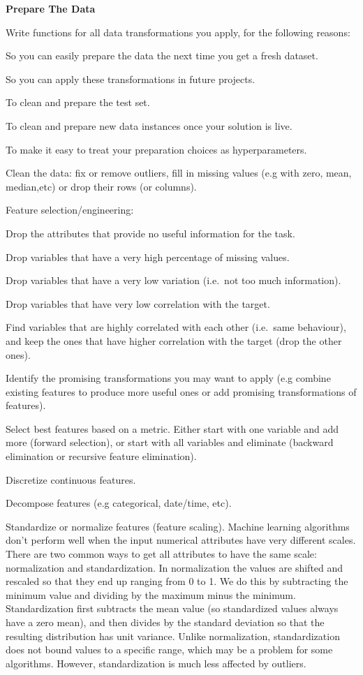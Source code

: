 \item \textbf{Prepare The Data}
\bit
\item Write functions for all data transformations you apply, for the following reasons:
\bit
\item So you can easily prepare the data the next time you get a fresh dataset.
\item So you can apply these transformations in future projects.
\item To clean and prepare the test set.
\item To clean and prepare new data instances once your solution is live.
\item To make it easy to treat your preparation choices as hyperparameters.
\eit

\item Clean the data: fix or remove outliers, fill in missing values (e.g with zero, mean, median,etc) or drop
their rows (or columns).
\item Feature selection/engineering:
\bit
\item Drop the attributes that provide no useful information for the task.
\item Drop variables that have a very high percentage of missing values.
\item Drop variables that have a very low variation (i.e.\ not too much information).
\item Drop variables that have very low correlation with the target.
\item Find variables that are highly correlated with each other (i.e.\ same behaviour), and keep the ones that have
higher correlation with the target (drop the other ones).
\item Identify the promising transformations you may want to apply (e.g combine existing features to produce more
useful ones or add promising transformations of features).
\item Select best features based on a metric. Either start with one variable and add more (forward selection), or
start with all variables and eliminate (backward elimination or recursive feature elimination).
\item Discretize continuous features.
\item Decompose features (e.g categorical, date/time, etc).
\item Standardize or normalize features (feature scaling). Machine learning algorithms don't perform well when the
input numerical attributes have very different scales. There are two common ways to get all attributes to have the
same scale: normalization and standardization. In normalization the values are shifted and rescaled so that they end
up ranging from 0 to 1. We do this by subtracting the minimum value and dividing by the maximum minus the minimum.
Standardization first subtracts the mean value (so standardized values always have a zero mean), and then divides by
the standard deviation so that the resulting distribution has unit variance. Unlike normalization, standardization
does not bound values to a specific range, which may be a problem for some algorithms. However, standardization is
much less affected by outliers.
\eit
\eit

